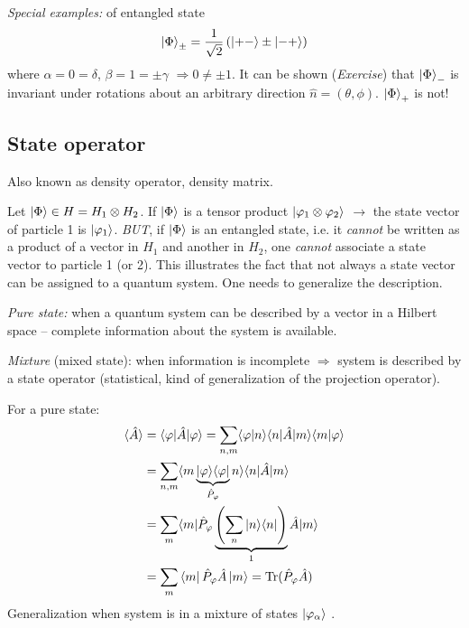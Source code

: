 \documentclass[12pt]{article}
\newcommand{\be}{\begin{equation}}
\newcommand{\ee}{\end{equation}}
\begin{document}
\emph{Special examples:} of entangled state
\be
\ket{\Phi}_{\pm} = \frac{1}{\sqrt{2}}
\left(\ket{+-} \pm \ket{-+}\right)
\ee
where $\alpha = 0 = \delta$, $\beta = 1 = \pm \gamma$ $\Rightarrow 0 \neq \pm 1$.
It can be shown (\emph{Exercise}) that $\ket{\Phi}_-$ is invariant under rotations about an
arbitrary direction $\hat{n} = (\theta, \phi)$. $\ket{\Phi}_+$ is not!

\subsection{State operator}

Also known as density operator, density matrix.

Let $\ket{\Phi} \in H = H_1 \otimes H_2$. If $\ket{\Phi}$ is a tensor
product $\ket{\varphi_1 \otimes \varphi_2}$ $\rightarrow$ the state vector of particle 1
is $\ket{\varphi_1}$.
\emph{BUT}, if $\ket{\Phi}$ is an entangled state, i.e.
it \emph{cannot} be written as a product of a vector
in $H_1$ and another in $H_2$, one \emph{cannot}
associate a state vector to particle 1 (or 2).
This illustrates the fact that not always a state
vector can be assigned to a quantum system.
One needs to generalize the description.

\emph{Pure state:} when a quantum system can be
described by a vector in a Hilbert space
-- complete information about the
system is available.

\emph{Mixture} (mixed state): when information is incomplete
$\Rightarrow$ system is described by a state operator
(statistical, kind of generalization of the projection operator).

For a pure state:
\be
\begin{aligned}
\langle\hat{A}\rangle
&=\langle\varphi|\hat{A}| \varphi\rangle=\sum_{n, m}\langle\varphi | n\rangle\langle n|\hat{A}| m\rangle\langle m | \varphi\rangle\\
&=\sum_{n, m}\langle m 
\underbrace{| \varphi\rangle\langle\varphi |}%
_{\hat{P}_\varphi}
n\rangle\langle n|\hat{A}| m\rangle\\
&=\sum_{m}\langle m |\hat{P}_{\varphi}
\underbrace{\left(\sum_{n}|n\rangle\langle n|\right)}%
_{1}
\hat{A}| m \rangle\\
&=\sum_m \bra{m}\hat{P}_\varphi\hat{A}\ket{m} = \operatorname{Tr}(\hat{P}_\varphi\hat{A})
\end{aligned}
\ee
Generalization when system is
in a mixture of states $\ket{\varphi_\alpha}$ .
\end{document}
